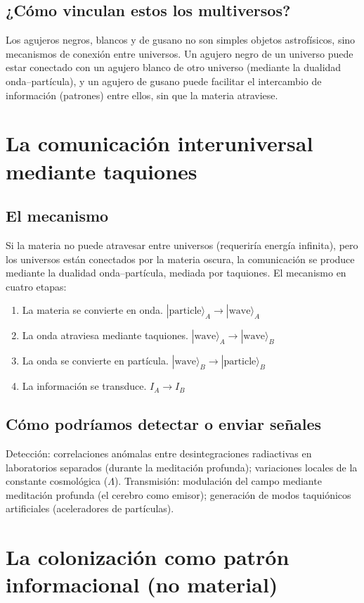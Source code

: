 \documentclass[11pt,a4paper]{article}
\begin{document}
\subsection{¿Cómo vinculan estos los multiversos?}
Los agujeros negros, blancos y de gusano no son simples objetos astrofísicos, sino mecanismos de conexión entre universos. Un agujero negro de un universo puede estar conectado con un agujero blanco de otro universo (mediante la dualidad onda--partícula), y un agujero de gusano puede facilitar el intercambio de información (patrones) entre ellos, sin que la materia atraviese.

\section{La comunicación interuniversal mediante taquiones}
\subsection{El mecanismo}
Si la materia no puede atravesar entre universos (requeriría energía infinita), pero los universos están conectados por la materia oscura, la comunicación se produce mediante la dualidad onda--partícula, mediada por taquiones. El mecanismo en cuatro etapas:
\begin{enumerate}
    \item La materia se convierte en onda. $|\text{particle}\rangle_A \to |\text{wave}\rangle_A$
    \item La onda atraviesa mediante taquiones. $|\text{wave}\rangle_A \to |\text{wave}\rangle_B$
    \item La onda se convierte en partícula. $|\text{wave}\rangle_B \to |\text{particle}\rangle_B$
    \item La información se transduce. $I_A \to I_B$
\end{enumerate}

\subsection{Cómo podríamos detectar o enviar señales}
Detección: correlaciones anómalas entre desintegraciones radiactivas en laboratorios separados (durante la meditación profunda); variaciones locales de la constante cosmológica ($\Lambda$). Transmisión: modulación del campo mediante meditación profunda (el cerebro como emisor); generación de modos taquiónicos artificiales (aceleradores de partículas).

\section{La colonización como patrón informacional (no material)}
\end{document}
